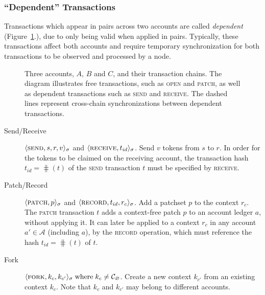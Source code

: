 \subsubsection{``Dependent'' Transactions}

Transactions which appear in pairs across two accounts are called
\emph{dependent} (Figure~\ref{tx-dependencies}.), due to only being valid when
applied in pairs. Typically, these transactions affect both accounts and
require temporary synchronization for both transactions to be observed and
processed by a node.

\begin{figure}[hbp]
    
    \caption{Three accounts, $A$, $B$ and $C$, and their transaction chains.
        The diagram illustrates free transactions, such as \textsc{open} and
        \textsc{patch}, as well as dependent transactions such as \textsc{send}
        and \textsc{receive}.  The dashed lines represent cross-chain
        synchronizations between dependent transactions.
    \label{tx-dependencies}}
\end{figure}

\begin{description}
    \item[Send/Receive] $\langle \text{\normalfont\scshape send}, s, r, v \rangle_{\sigma}$ and
        $\langle \text{\normalfont\scshape receive}, t_{id} \rangle_{\sigma}$. Send $v$ tokens from $s$ to $r$. In
        order for the tokens to be claimed on the receiving account, the
        transaction hash $t_{id} = \hash(t)$ of the \textsc{send} transaction
        $t$ must be specified by \textsc{receive}.
    \item[Patch/Record] $\langle \text{\normalfont\scshape patch}, p \rangle_\sigma$ and $\langle \text{\normalfont\scshape record}, t_{id},
        r_c \rangle_{\sigma}$.  Add a patchset $p$ to the context $r_c$. The
        \textsc{patch} transaction $t$ adds a context-free patch $p$ to an
        account ledger $a$, without applying it. It can later be applied to a
        context $r_c$ in any account $a' \in \mathcal{A}$ (including $a$), by
        the \textsc{record} operation, which must reference the hash $t_{id} =
        \hash(t)$ of $t$.
    \item[Fork] $\langle \text{\normalfont\scshape fork}, k_c, k_{c'} \rangle_\sigma \; \text{where} \; k_c \neq
        \mathcal{C}_{\varnothing}$. Create a new context $k_{c'}$ from an
        existing context $k_c$. Note that $k_c$ and $k_{c'}$ may belong to
        different accounts.
\end{description}
